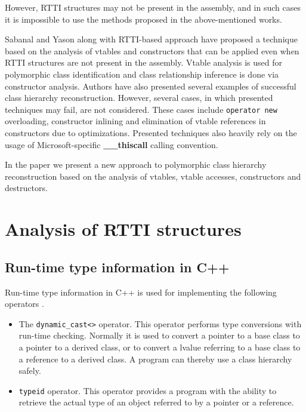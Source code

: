 \documentclass[10pt, conference]{IEEEtran}
\newcommand{\compact}{}
\begin{document}
However, RTTI structures may not be present in the assembly, and in
such cases it is impossible to use the methods proposed in the
above-mentioned works.

Sabanal and Yason \cite{sabanal07} along with RTTI-based approach
have proposed a technique based on the analysis of vtables and
constructors that can be applied even when RTTI structures are
not present in the assembly.
Vtable analysis is used for polymorphic class identification
and class relationship inference is done via constructor analysis.
Authors have also presented several examples of successful class
hierarchy reconstruction.
However, several cases, in which presented techniques may fail, are
not considered.
These cases include \lstinline{operator new} overloading,
constructor inlining and elimination of vtable references in
constructors due to optimizations.
Presented techniques also heavily rely on the usage of
Microsoft-specific \textbf{\_\_thiscall} calling convention.

In the paper we present a new approach to polymorphic class
hierarchy reconstruction based on the analysis of vtables,
vtable accesses, constructors and destructors.




\quad

\section{Analysis of RTTI structures}
\label{sectionRTTIAnalysis}

\subsection{Run-time type information in C++}
Run-time type information in C++ is used for
implementing the following operators \cite{stroustrup97}.
\begin{itemize}\compact
\item The \lstinline{dynamic_cast<>} operator.
    This operator performs type conversions with run-time checking.
    Normally it is used to
    convert a pointer to a base class to a pointer to a
    derived class, or to convert a lvalue referring
    to a base class to a reference to a derived class.
    A program can thereby use a class hierarchy safely.
\item \lstinline{typeid} operator. This operator provides a program 
    with the ability to retrieve the actual type of an object referred 
    to by a pointer or a reference.
\end{itemize}
\end{document}
